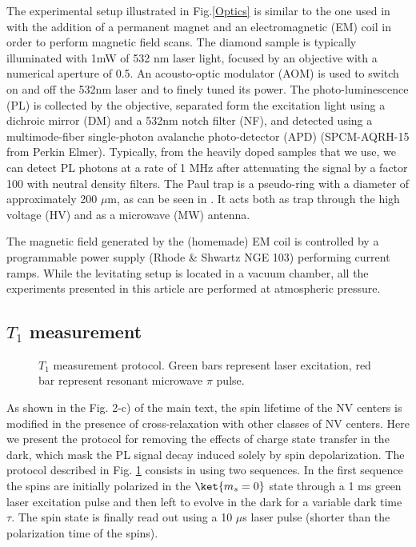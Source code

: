 \documentclass[preprintnumbers,amsmath,amssymb,onecolumn,12pt]{revtex4}
\begin{document}
The experimental setup illustrated in Fig.\ref{Optics} is similar to the one used in \citep{DelordPRL} with the addition of a permanent magnet and an electromagnetic (EM) coil in order to perform magnetic field scans. The diamond sample is typically illuminated with 1mW of 532 nm laser light, focused by an objective with a numerical aperture of 0.5. An acousto-optic modulator (AOM) is used to switch on and off the 532nm laser and to finely tuned its power. The photo-luminescence (PL) is collected by the objective, separated form the excitation light using a dichroic mirror (DM) and a 532nm notch filter (NF), and detected using a multimode-fiber single-photon avalanche photo-detector (APD) (SPCM-AQRH-15 from Perkin Elmer). Typically, from the heavily doped samples that we use, we can detect PL photons at a rate of 1 MHz after attenuating the signal by a factor 100 with neutral density filters. 
The Paul trap is a pseudo-ring with a diameter of approximately 200 $\mu$m, as can be seen in \citep{DelordPhD}. It acts both as trap through the high voltage (HV) and as a microwave (MW) antenna.

The magnetic field generated by the (homemade) EM coil is controlled by a programmable power supply (Rhode \& Shwartz NGE 103) performing current ramps.
While the levitating setup is located in a vacuum chamber, all the experiments presented in this article are performed at atmospheric pressure.

\subsection{$T_1$ measurement}
\begin{figure}[!ht]
  \centering {}
  \caption{$T_1$ measurement protocol. Green bars represent laser excitation, red bar represent resonant microwave $\pi$ pulse.}
	\label{T1_protocol}
\end{figure}

As shown in the Fig. 2-c) of the main text, the spin lifetime of the NV centers is modified in the presence of cross-relaxation with other classes of NV centers.
Here we present the protocol for removing the effects of charge state transfer in the dark, which mask the PL signal decay induced solely by spin depolarization. 
The protocol described in Fig. \ref{T1_protocol} consists in using two sequences. In the first sequence the spins are initially polarized in the $\ket{m_s=0}$ state through a 1 ms green laser excitation pulse and then left to evolve in the dark for a variable dark time $\tau$. The spin state is finally read out using a 10 $\mu$s laser pulse (shorter than the polarization time of the spins).
\end{document}
